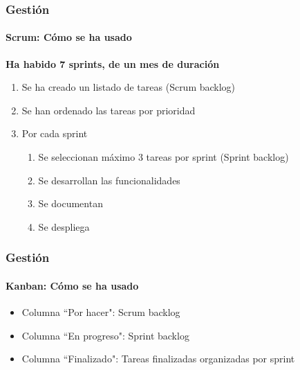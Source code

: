 \begin{frame}
	\frametitle{Gesti\'on}
	\framesubtitle{Scrum: C\'omo se ha usado}
	
	\textbf{Ha habido 7 sprints, de un mes de duraci\'on}
	\begin{enumerate}
		\item Se ha creado un listado de tareas (Scrum backlog)
		\item Se han ordenado las tareas por prioridad
		\item Por cada sprint
		\begin{enumerate}
			\item Se seleccionan m\'aximo 3 tareas por sprint (Sprint backlog)
			\item Se desarrollan las funcionalidades
			\item Se documentan
			\item Se despliega
		\end{enumerate}
	\end{enumerate}	
\end{frame}

\begin{frame}
	\frametitle{Gesti\'on}
	\framesubtitle{Kanban: C\'omo se ha usado}
	\begin{itemize}
		\item Columna ``Por hacer": Scrum backlog
		\item Columna ``En progreso": Sprint backlog
		\item Columna ``Finalizado": Tareas finalizadas organizadas por 
		sprint
	\end{itemize}
\end{frame}